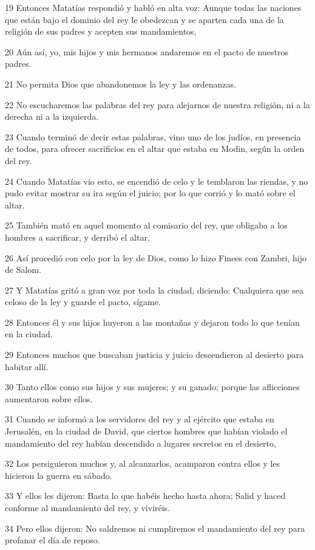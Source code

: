 \par 19 Entonces Matatías respondió y habló en alta voz: Aunque todas las naciones que están bajo el dominio del rey le obedezcan y se aparten cada una de la religión de sus padres y acepten sus mandamientos,
\par 20 Aún así, yo, mis hijos y mis hermanos andaremos en el pacto de nuestros padres.
\par 21 No permita Dios que abandonemos la ley y las ordenanzas.
\par 22 No escucharemos las palabras del rey para alejarnos de nuestra religión, ni a la derecha ni a la izquierda.
\par 23 Cuando terminó de decir estas palabras, vino uno de los judíos, en presencia de todos, para ofrecer sacrificios en el altar que estaba en Modin, según la orden del rey.
\par 24 Cuando Matatías vio esto, se encendió de celo y le temblaron las riendas, y no pudo evitar mostrar su ira según el juicio; por lo que corrió y lo mató sobre el altar.
\par 25 También mató en aquel momento al comisario del rey, que obligaba a los hombres a sacrificar, y derribó el altar.
\par 26 Así procedió con celo por la ley de Dios, como lo hizo Finees con Zambri, hijo de Salom.
\par 27 Y Matatías gritó a gran voz por toda la ciudad, diciendo: Cualquiera que sea celoso de la ley y guarde el pacto, sígame.
\par 28 Entonces él y sus hijos huyeron a las montañas y dejaron todo lo que tenían en la ciudad.
\par 29 Entonces muchos que buscaban justicia y juicio descendieron al desierto para habitar allí.
\par 30 Tanto ellos como sus hijos y sus mujeres; y su ganado; porque las aflicciones aumentaron sobre ellos.
\par 31 Cuando se informó a los servidores del rey y al ejército que estaba en Jerusalén, en la ciudad de David, que ciertos hombres que habían violado el mandamiento del rey habían descendido a lugares secretos en el desierto,
\par 32 Los persiguieron muchos y, al alcanzarlos, acamparon contra ellos y les hicieron la guerra en sábado.
\par 33 Y ellos les dijeron: Basta lo que habéis hecho hasta ahora; Salid y haced conforme al mandamiento del rey, y viviréis.
\par 34 Pero ellos dijeron: No saldremos ni cumpliremos el mandamiento del rey para profanar el día de reposo.
